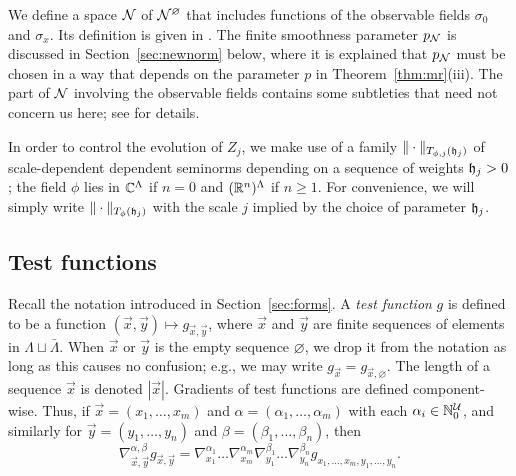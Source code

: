 We define a space $\mathcal{N}$ of $\mathcal{N}^\varnothing$ that includes functions
of the observable fields $\sigma_0$ and $\sigma_x$. Its definition is given
in \cite[Section~\ref{phi4-sec:phi4observables_representation}]{ST-phi4}.
The finite smoothness parameter $p_{\mathcal{N}}$ is discussed in Section~\ref{sec:newnorm}
below, where it is explained that $p_{\mathcal{N}}$ must be chosen in a way that depends on the
parameter $p$ in Theorem~\ref{thm:mr}(iii).
The part of $\mathcal{N}$ involving the observable fields contains some subtleties that
need not concern us here; see \cite[Section~\ref{phi4-sec:phi4observables_representation}]{ST-phi4}
for details.

In order to control the evolution of $Z_j$, we make use of a family
$\|\cdot\|_{T_{\phi,j}(\mathfrak{h}_j)}$ of scale-dependent dependent seminorms depending on a
sequence of weights $\mathfrak{h}_j > 0$; the field $\phi$ lies in $\mathbb{C}^\Lambda$ if $n = 0$ and
$({\mathbb R}^n)^\Lambda$ if $n \ge 1$. For convenience,
we will simply write $\|\cdot\|_{T_\phi(\mathfrak{h}_j)}$ with the scale $j$ implied by the
choice of parameter $\mathfrak{h}_j$.

\subsection{Test functions}

Recall the notation introduced in Section~\ref{sec:forms}.
A \emph{test function} $g$ is defined to be a function $(\vec x, \vec y) \mapsto g_{\vec x,\vec y}$,
where $\vec x$ and $\vec y$ are finite sequences of elements in $\Lambda \sqcup \bar\Lambda$.
When $\vec x$ or $\vec y$ is the empty sequence $\varnothing$,
we drop it from the notation as long as this causes no confusion;
e.g., we may write $g_{\vec x} = g_{\vec x,\varnothing}$.
The length of a sequence $\vec x$ is denoted $|\vec x|$.
Gradients of test functions are defined component-wise.
Thus, if $\vec x = (x_1, \ldots, x_m)$
and $\alpha = (\alpha_1, \ldots, \alpha_m)$
with each $\alpha_i \in {\mathbb N}_0^{\mathcal{U}}$, and similarly for $\vec y=(y_1,\ldots,y_n)$ and
$\beta=(\beta_1,\ldots,\beta_n)$,
then
\begin{equation}
\nabla^{\alpha,\beta}_{\vec x,\vec y} g_{\vec x,\vec y}
  =
\nabla^{\alpha_1}_{x_1} \ldots \nabla^{\alpha_m}_{x_m}
\nabla^{\beta_1}_{y_1} \ldots \nabla^{\beta_n}_{y_n}  g_{x_1,\ldots,x_m,y_1,\ldots,y_n}.
\end{equation}

